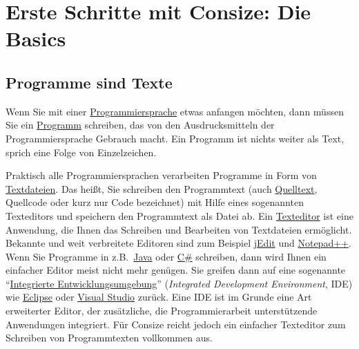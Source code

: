 \chapter{Erste Schritte mit Consize: Die Basics}
\label{Sec:Basics}

\section{Programme sind Texte}

Wenn Sie mit einer \href{http://de.wikipedia.org/wiki/Programmiersprache}{Programmiersprache} etwas anfangen möchten, dann müssen Sie ein \href{http://de.wikipedia.org/wiki/Computerprogramm}{Programm} schreiben, das von den Ausdrucksmitteln der Programmiersprache Gebrauch macht. Ein Programm ist nichts weiter als Text, sprich eine Folge von Einzelzeichen.

Praktisch alle Programmiersprachen verarbeiten Programme in Form von \href{http://de.wikipedia.org/wiki/Textdatei}{Textdateien}. Das heißt, Sie schreiben den Programmtext (auch \href{http://de.wikipedia.org/wiki/Quelltext}{Quelltext}, Quellcode oder kurz nur Code bezeichnet) mit Hilfe eines sogenannten Texteditors und speichern den Programmtext als Datei ab. Ein \href{http://de.wikipedia.org/wiki/Texteditor}{Text\-edi\-tor} ist eine Anwendung, die Ihnen das Schreiben und Bearbeiten von Textdateien ermöglicht. Bekannte und weit verbreitete Editoren sind zum Beispiel \href{http://www.jedit.org}{jEdit} und \href{http://www.notepad-plus-plus.org/}{Notepad++}. Wenn Sie Programme in z.B.\ \href{http://de.wikipedia.org/wiki/Java\_(Programmiersprache)}{Java} oder \href{http://de.wikipedia.org/wiki/C-Sharp}{C\#} schreiben, dann wird Ihnen ein einfacher Editor meist nicht mehr genügen. Sie greifen dann auf eine sogenannte "`\href{http://de.wikipedia.org/wiki/Integrierte\_Entwicklungsumgebung}{Integrierte Entwicklungsumgebung}"' (\emph{Integrated Development Environment}, IDE) wie \href{http://de.wikipedia.org/wiki/Eclipse\_(IDE)}{Eclipse} oder \href{http://de.wikipedia.org/wiki/Visual\_Studio}{Visual Studio} zurück. Eine IDE ist im Grunde eine Art erweiterter Editor, der zusätzliche, die Programmierarbeit unterstützende Anwendungen integriert. Für Consize reicht jedoch ein einfacher Texteditor zum Schreiben von Programmtexten vollkommen aus.

